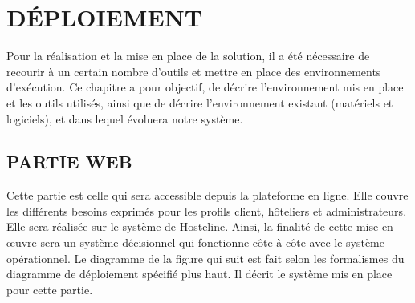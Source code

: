 \chapter{DÉPLOIEMENT}


Pour la réalisation et la mise en place de la solution, il a été nécessaire de recourir à un certain nombre d’outils et mettre en place des environnements d’exécution.
Ce chapitre a pour objectif, de décrire l’environnement mis en place et les outils utilisés, ainsi que de décrire l’environnement existant (matériels et logiciels), et dans lequel évoluera notre système.

\section{PARTIE WEB}
 Cette partie est celle qui sera accessible depuis la plateforme en ligne. Elle couvre les différents besoins exprimés pour les profils client, hôteliers et administrateurs. Elle sera réalisée sur le système de Hosteline. Ainsi, la finalité de cette mise en œuvre sera un système décisionnel qui fonctionne côte à côte avec le système opérationnel. Le diagramme de la figure qui suit est fait selon les formalismes du diagramme de déploiement spécifié plus haut. Il décrit le système mis en place pour cette partie.
 
